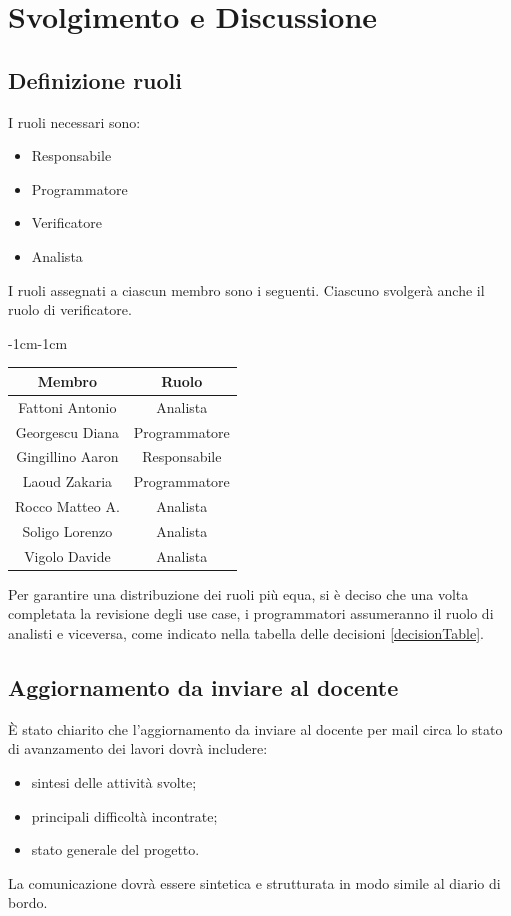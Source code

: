 \documentclass[a4paper,12pt]{article}
\begin{document}
\section{Svolgimento e Discussione}



\subsection{Definizione ruoli}
I ruoli necessari sono:
\begin{itemize}[noitemsep]
    \item Responsabile
    \item Programmatore
    \item Verificatore
    \item Analista
\end{itemize}

I ruoli assegnati a ciascun membro sono i seguenti. Ciascuno svolgerà anche il ruolo di verificatore.
\begin{table}[H]
    \begin{adjustwidth}{-1cm}{-1cm}
    \centering
\begin{tabular}{|c|c|}
    \hline
    \textbf{Membro} & \textbf{Ruolo} \\
    \hline
    Fattoni Antonio & Analista \\
    \hline
    Georgescu Diana & Programmatore \\
    \hline
    Gingillino Aaron & Responsabile \\
    \hline
    Laoud Zakaria & Programmatore \\
    \hline
    Rocco Matteo A. & Analista \\
    \hline
    Soligo Lorenzo & Analista \\
    \hline
    Vigolo Davide & Analista \\
    \hline
\end{tabular}
    \end{adjustwidth}
\end{table}

Per garantire una distribuzione dei ruoli più equa, si è deciso che una volta completata la revisione degli use case, i programmatori assumeranno il ruolo di analisti e viceversa, come indicato nella tabella delle decisioni \ref{decisionTable}.

\subsection{Aggiornamento da inviare al docente}
È stato chiarito che l'aggiornamento da inviare al docente per mail circa lo stato di avanzamento dei lavori dovrà includere:
\begin{itemize}[noitemsep]
    \item sintesi delle attività svolte;
    \item principali difficoltà incontrate;
    \item stato generale del progetto.
\end{itemize}
La comunicazione dovrà essere sintetica e strutturata in modo simile al diario di bordo.
\end{document}
